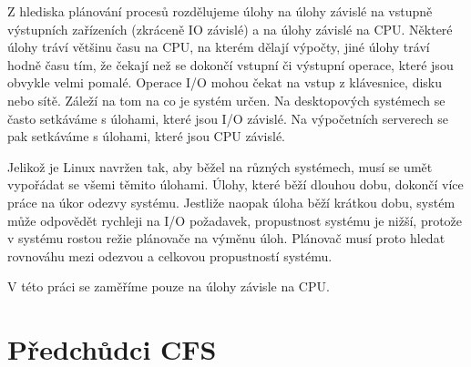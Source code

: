 \documentclass[
  field=ainfk,
  biblatex,
  glossaries,
  index
]{kidiplom}
\begin{document}
Z hlediska plánování procesů rozdělujeme úlohy na úlohy závislé na vstupně výstupních zařízeních (zkráceně IO závislé) a na úlohy závislé na CPU. Některé úlohy tráví většinu času na CPU, na kterém dělají výpočty, jiné úlohy tráví hodně času tím, že čekají než se dokončí vstupní či výstupní operace, které jsou obvykle velmi pomalé. Operace I/O mohou čekat na vstup z klávesnice, disku nebo sítě. 
Záleží na tom na co je systém určen. Na desktopových systémech se často setkáváme s úlohami, které jsou I/O závislé. Na výpočetních serverech se pak setkáváme s úlohami, které jsou CPU závislé. 

Jelikož je Linux navržen tak, aby běžel na různých systémech, musí se umět vypořádat se všemi těmito úlohami. Úlohy, které běží dlouhou dobu, dokončí více práce na úkor odezvy systému. Jestliže naopak úloha běží krátkou dobu, systém může odpovědět rychleji na I/O požadavek, propustnost systému je nižší, protože v systému rostou režie plánovače na výměnu úloh. Plánovač musí proto hledat rovnováhu mezi odezvou a celkovou propustností systému. 

V této práci se zaměříme pouze na úlohy závisle na CPU.

\section{Předchůdci CFS}
\end{document}
